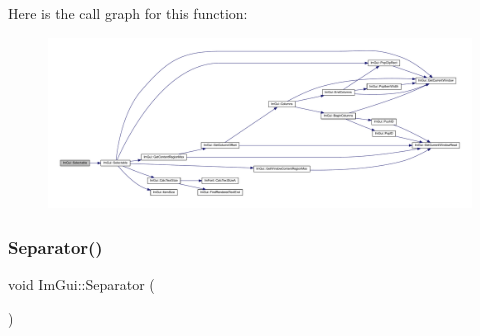 Here is the call graph for this function\+:
\nopagebreak
\begin{figure}[H]
\begin{center}
\leavevmode
\includegraphics[width=350pt]{namespace_im_gui_a9229a9c3c304ffc0c98ffe2ee4ff5e40_cgraph}
\end{center}
\end{figure}
\mbox{\label{namespace_im_gui_a191123597a5084d003c8beac7eeb029e}} 
\subsubsection{\texorpdfstring{Separator()}{Separator()}}
{\footnotesize\ttfamily void Im\+Gui\+::\+Separator (\begin{DoxyParamCaption}{ }\end{DoxyParamCaption})}

